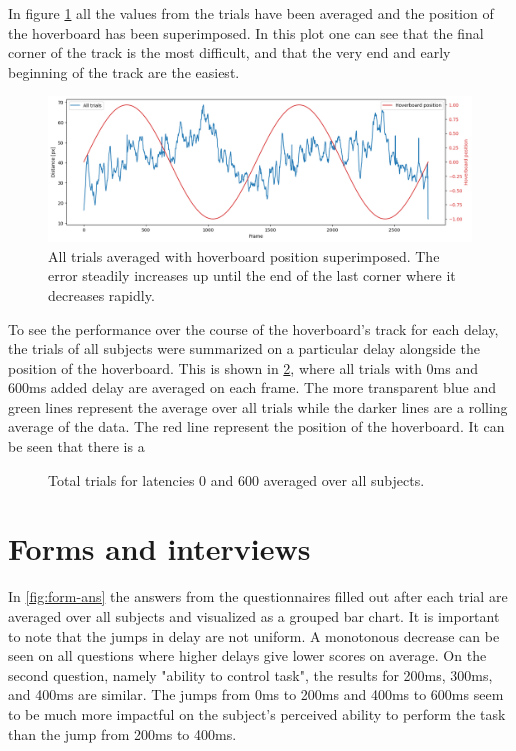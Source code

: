 \documentclass[nofilelist]{cslthse-msc}
\begin{document}
In figure \ref{fig:hoverboard-pos} all the values from the trials have been averaged and the position of the hoverboard has been superimposed. In this plot one can see that the final corner of the track is the most difficult, and that the very end and early beginning of the track are the easiest. 

\begin{figure}[!hbt]
   \centering
   \includegraphics[scale=0.4]{images/hoverboard-pos.png} 
   \caption{All trials averaged with hoverboard position superimposed. The error steadily increases up until the end of the last corner where it decreases rapidly.}
   \label{fig:hoverboard-pos}
\end{figure}

To see the performance over the course of the hoverboard's track for each delay, the trials of all subjects were summarized on a particular delay alongside the position of the hoverboard. This is shown in \ref{fig:0vs600}, where all trials with 0ms and 600ms added delay are averaged on each frame. The more transparent blue and green lines represent the average over all trials while the darker lines are a rolling average of the data. The red line represent the position of the hoverboard.
It can be seen that there is a    

\begin{figure}[!hbt]
   \centering
   \caption{Total trials for latencies 0 and 600 averaged over all subjects.}
   \label{fig:0vs600}
\end{figure}


\section{Forms and interviews}
In \ref{fig:form-ans} the answers from the questionnaires filled out after each trial are averaged over all subjects and visualized as a grouped bar chart. It is important to note that the jumps in delay are not uniform. A monotonous decrease can be seen on all questions where higher delays give lower scores on average. 
On the second question, namely "ability to control task", the results for 200ms, 300ms, and 400ms are similar. The jumps from 0ms to 200ms and 400ms to 600ms seem to be much more impactful on the subject's perceived ability to perform the task than the jump from 200ms to 400ms.
\end{document}
